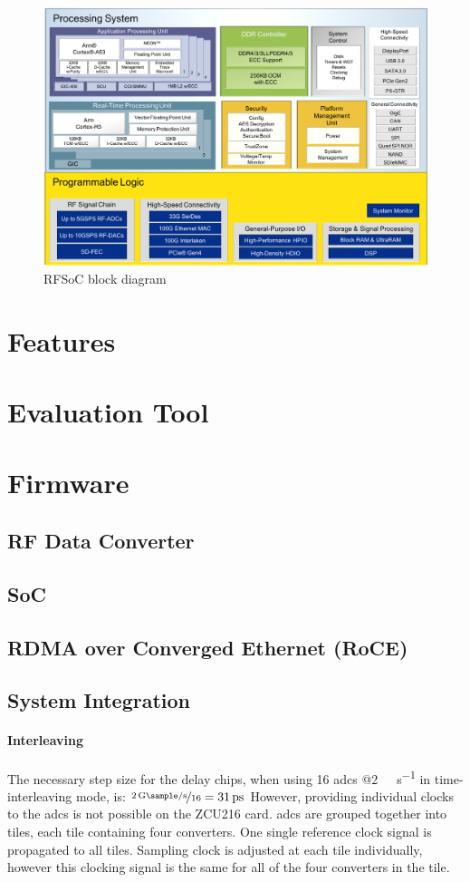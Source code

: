 \begin{figure}[tbh]
	\centering
	\includegraphics[width = \textwidth]{chap/04-work/img/rfsoc_blockdiagram}
	\caption{RFSoC block diagram}
	\label{fig:rfsoc}
\end{figure}

\section{Features}
\section{Evaluation Tool}

\section{Firmware}
\subsection{RF Data Converter}
\subsection{SoC}
\subsection{RDMA over Converged Ethernet (RoCE)}

\subsection{System Integration}
\paragraph{Interleaving}
The necessary step size for the delay chips, when using 16 \glspl{adc} @\SI{2}{\giga \sample \per \second} in time-interleaving mode, is: $\nicefrac{\SI{2}{\giga \sample \per \second}}{16} = \SI{31}{\pico \second}$
However, providing individual clocks to the \glspl{adc} is not possible on the ZCU216 card. \glspl{adc} are grouped together into tiles, each tile containing four converters. One single reference clock signal is propagated to all tiles. Sampling clock is adjusted at each tile individually, however this clocking signal is the same for all of the four converters in the tile.

